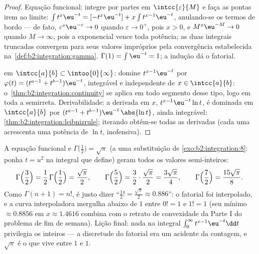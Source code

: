 \begin{proof}
Equação funcional: integre por partes em $\intcc{\varepsilon}{M}$
e faça as pontas irem ao limite: $\int t^{x}\eu^{-t} = [-t^x\eu^{-t}] + x\int
t^{x-1}\eu^{-t}$, anulando-se os termos de bordo --- de fato,
$\varepsilon^x\eu^{-\varepsilon} \to 0$ quando $\varepsilon \to
0^+$, pois $x > 0$, e $M^x\eu^{-M} \to 0$ quando $M \to \infty$,
pois a exponencial vence toda potência; as duas integrais truncadas
convergem para seus valores impróprios pela convergência
estabelecida na~\cref{def:b2:integration:gamma}. $\Gamma(1) = \int
\eu^{-t} = 1$; a indução dá o fatorial.

 em $\intcc{a}{b} \subset \intoo{0}{\infty}$: domine
$t^{x-1}\eu^{-t}$ por $\varphi(t) = (t^{a-1} + t^{b-1})\eu^{-t}$,
integrável e independente de $x \in \intcc{a}{b}$:
o~\cref{thm:b2:integration:continuity} se aplica em todo segmento desse tipo,
logo em toda a semirreta. Derivabilidade: a derivada em $x$,
$t^{x-1}\eu^{-t}\ln t$, é dominada em $\intcc{a}{b}$ por $(t^{a-1}
+ t^{b-1})\eu^{-t}\,\abs{\ln t}$, ainda integrável:
\cref{thm:b2:integration:leibnizrule}; iterando obtêm-se todas as
derivadas (cada uma acrescenta uma potência de $\ln t$, inofensiva).
\end{proof}

\begin{example}\label{ex:b2:integration:halffactorial}
A equação funcional e $\Gamma\bigl(\frac12\bigr) =
\sqrt\pi$ (a uma substituição de
\cref{exo:b2:integration:8}: ponha $t = u^2$ na integral que
define) geram todos os valores semi-inteiros:
\[
\Gamma\Bigl(\frac32\Bigr) = \frac12\,\Gamma\Bigl(\frac12\Bigr)
= \frac{\sqrt\pi}{2},
\qquad
\Gamma\Bigl(\frac52\Bigr) = \frac32\cdot\frac{\sqrt\pi}{2}
= \frac{3\sqrt\pi}{4},
\qquad
\Gamma\Bigl(\frac72\Bigr) = \frac{15\sqrt\pi}{8} .
\]
Como $\Gamma(n+1) = n!$, é justo dizer ``$\frac12! =
\frac{\sqrt\pi}{2} \approx 0.886$'': o fatorial foi
interpolado, e a curva interpoladora mergulha abaixo de $1$
entre $0! = 1$ e $1! = 1$ (seu mínimo $\approx 0.8856$ em
$x \approx 1.4616$ combina com o retrato de convexidade da
Parte I do problema de fim de semana). Lição final: nada na
integral $\int_0^\infty t^{x-1}\eu^{-t}\dd t$ privilegia os
inteiros --- a discretude do fatorial era um acidente da
contagem, e $\sqrt\pi$ é o que vive entre $1$ e $1$.
\end{example}

